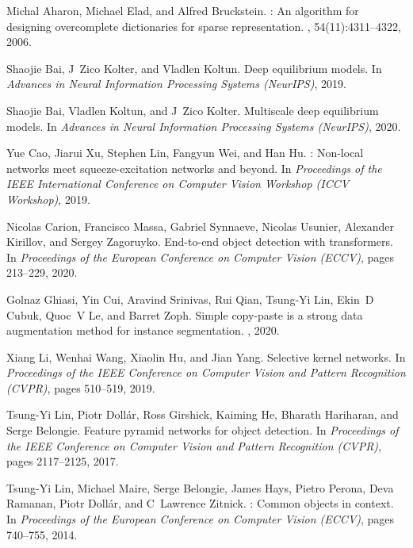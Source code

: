 \documentclass[10pt,twocolumn,letterpaper]{article}
\begin{document}
{\small
	\begin{thebibliography}{10}\itemsep=-1pt
	
	Michal Aharon, Michael Elad, and Alfred Bruckstein.
	: An algorithm for designing overcomplete dictionaries for
	sparse representation.
	, 54(11):4311--4322,
	2006.
	
	Shaojie Bai, J~Zico Kolter, and Vladlen Koltun.
	\newblock Deep equilibrium models.
	\newblock In {\em Advances in Neural Information Processing Systems (NeurIPS)},
	2019.
	
	Shaojie Bai, Vladlen Koltun, and J~Zico Kolter.
	\newblock Multiscale deep equilibrium models.
	\newblock In {\em Advances in Neural Information Processing Systems (NeurIPS)},
	2020.
	
	Yue Cao, Jiarui Xu, Stephen Lin, Fangyun Wei, and Han Hu.
	: Non-local networks meet squeeze-excitation networks and
	beyond.
	\newblock In {\em Proceedings of the IEEE International Conference on Computer
		Vision Workshop (ICCV Workshop)}, 2019.
	
	Nicolas Carion, Francisco Massa, Gabriel Synnaeve, Nicolas Usunier, Alexander
	Kirillov, and Sergey Zagoruyko.
	\newblock End-to-end object detection with transformers.
	\newblock In {\em Proceedings of the European Conference on Computer Vision
		(ECCV)}, pages 213--229, 2020.
	
	Golnaz Ghiasi, Yin Cui, Aravind Srinivas, Rui Qian, Tsung-Yi Lin, Ekin~D Cubuk,
	Quoc~V Le, and Barret Zoph.
	\newblock Simple copy-paste is a strong data augmentation method for instance
	segmentation.
	, 2020.
	
	Xiang Li, Wenhai Wang, Xiaolin Hu, and Jian Yang.
	\newblock Selective kernel networks.
	\newblock In {\em Proceedings of the IEEE Conference on Computer Vision and
		Pattern Recognition (CVPR)}, pages 510--519, 2019.
	
	Tsung-Yi Lin, Piotr Doll{\'a}r, Ross Girshick, Kaiming He, Bharath Hariharan,
	and Serge Belongie.
	\newblock Feature pyramid networks for object detection.
	\newblock In {\em Proceedings of the IEEE Conference on Computer Vision and
		Pattern Recognition (CVPR)}, pages 2117--2125, 2017.
	
	Tsung-Yi Lin, Michael Maire, Serge Belongie, James Hays, Pietro Perona, Deva
	Ramanan, Piotr Doll{\'a}r, and C~Lawrence Zitnick.
	: Common objects in context.
	\newblock In {\em Proceedings of the European Conference on Computer Vision
		(ECCV)}, pages 740--755, 2014.
	

\end{thebibliography}}
\end{document}

